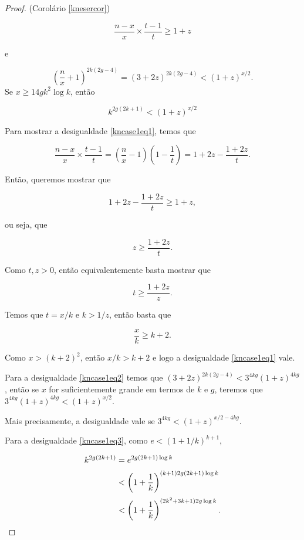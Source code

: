 \documentclass{article}
\begin{document}
\begin{proof}{(Corolário \ref{knesercor})}


\begin{equation}\label{kncase1eq1}
\frac{n-x}{x}\times \frac{t-1}{t} \geq 1+z
\end{equation}

e

\begin{equation}\label{kncase1eq2}
\left(\frac{n}{x}+1\right)^{2k(2g-4)} = (3+2z)^{2k(2g-4)} < (1+z)^{x/2}.
\end{equation}
Se $x \geq 14gk^2\log k$, então

\begin{equation}\label{kncase1eq3}
k^{2g(2k+1)} < (1+z)^{x/2}
\end{equation}

Para mostrar a desigualdade \ref{kncase1eq1}, temos que

\[\frac{n-x}{x}\times \frac{t-1}{t} = \left(\frac{n}{x} - 1\right)\left(1 - \frac{1}{t}\right) = 1 + 2z - \frac{1+2z}{t}.\]

Então, queremos mostrar que

\[1 + 2z - \frac{1+2z}{t} \geq 1 + z,\]

ou seja, que

\[z \geq \frac{1+2z}{t}.\]

Como $t,z > 0$, então equivalentemente basta mostrar que 

\[t \geq \frac{1+2z}{z}.\]

Temos que $t = x/k$ e $k > 1/z$, então basta que

\[\frac{x}{k} \geq k + 2.\]

Como $x>(k+2)^2$, então $x/k > k+2$ e logo a desigualdade \ref{kncase1eq1} vale.\vspace{1em}

Para a desigualdade \ref{kncase1eq2} temos que $(3+2z)^{2k(2g-4)} < 3^{4kg}(1+z)^{4kg}$, então se $x$ for suficientemente grande em termos de $k$ e $g$, teremos que $3^{4kg}(1+z)^{4kg} < (1+z)^{x/2}$.

Mais precisamente, a desigualdade vale se $3^{4kg} < (1+z)^{x/2 - 4kg}$.\vspace{1em}

Para a desigualdade \ref{kncase1eq3}, como $e < (1+1/k)^{k+1}$,

\begin{equation*}
\setlength{\jot}{5pt}
\begin{aligned}
k^{2g(2k+1)} & = e^{2g(2k+1)\log k}\\
& < \left(1+\frac{1}{k}\right)^{(k+1)2g(2k+1)\log k}\\
& < \left(1+\frac{1}{k}\right)^{(2k^2+3k+1)2g\log k}.
\end{aligned}
\end{equation*}


\end{proof}
\end{document}
